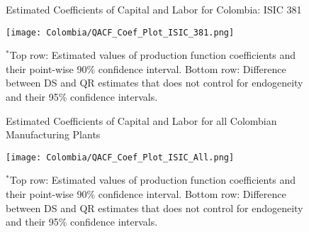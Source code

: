 \documentclass[12pt]{article}
\begin{document}
\begin{figure}[H]
\centering
\caption{Estimated Coefficients of Capital and Labor for Colombia: ISIC 381}
\texttt{[image: Colombia/QACF\_Coef\_Plot\_ISIC\_381.png]}
\caption*{\footnotesize $^{*}$Top row: Estimated values of production function coefficients and their point-wise 90\% confidence interval. Bottom row: Difference between DS and QR estimates that does not control for endogeneity and their 95\% confidence intervals.}
\label{fig:QACFCOL381}
\end{figure}

\begin{figure}[H]
\centering
\caption{Estimated Coefficients of Capital and Labor for all Colombian Manufacturing Plants}
\texttt{[image: Colombia/QACF\_Coef\_Plot\_ISIC\_All.png]}
\caption*{\footnotesize $^{*}$Top row: Estimated values of production function coefficients and their point-wise 90\% confidence interval. Bottom row: Difference between DS and QR estimates that does not control for endogeneity and their 95\% confidence intervals.}
\label{fig:QACFCOLall}
\end{figure}
\end{document}
